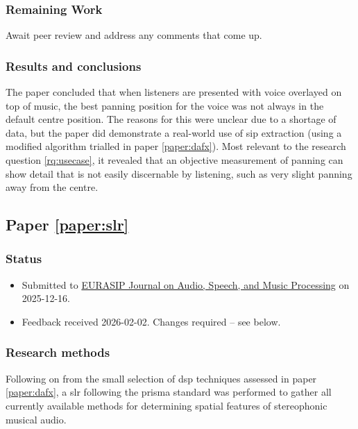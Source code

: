 \documentclass[a4paper]{article}
\begin{document}
\begin{refsection}
\subsubsection*{Remaining Work}
Await peer review and address any comments that come up.

\subsubsection*{Results and conclusions}
The paper concluded that when listeners are presented with voice overlayed on top of music, the best panning position for the voice was not always in the default centre position. The reasons for this were unclear due to a shortage of data, but the paper did demonstrate a real-world use of \gls{sip} extraction (using a modified algorithm trialled in paper \ref{paper:dafx}). Most relevant to the research question \ref{rq:usecase}, it revealed that an objective measurement of panning can show detail that is not easily discernable by listening, such as very slight panning away from the centre.


\subsection*{Paper \ref{paper:slr}}
\textbf{}
\subsubsection*{Status}
\begin{itemize}
\item Submitted to \href{https://asmp-eurasipjournals.springeropen.com/}{EURASIP Journal on Audio, Speech, and Music Processing} on 2025-12-16.
\item Feedback received 2026-02-02. Changes required -- see below.
\end{itemize}

\subsubsection*{Research methods}
Following on from the small selection of \gls{dsp} techniques assessed in paper \ref{paper:dafx}, a \gls{slr} following the \gls{prisma} standard was performed to gather all currently available methods for determining spatial features of stereophonic musical audio.


\end{refsection}
\end{document}
